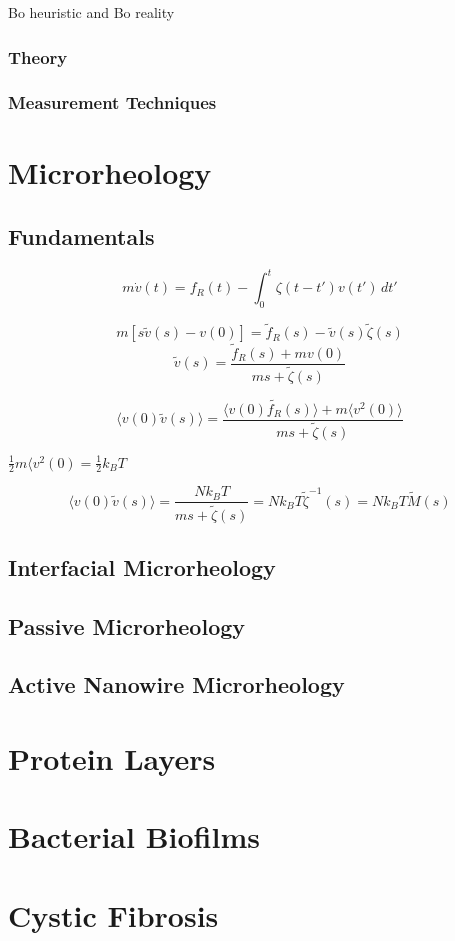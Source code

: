 Bo heuristic and Bo reality
\subsubsection{Theory}
\subsubsection{Measurement Techniques}
\section{Microrheology}
\subsection{Fundamentals}

\begin{equation}
  m\dot{v}(t) = f_R(t) - \int_0^t\zeta(t-t')v(t')\,dt'
\end{equation}

\begin{equation}
  m\left[s\tilde{v}(s) - v(0)\right] = \tilde{f}_R(s) - \tilde{v}(s)\tilde{\zeta}(s)
\end{equation}
\begin{equation}
  \tilde{v}(s) = \frac{\tilde{f}_R(s) + mv(0)}{ms + \tilde{\zeta}(s)}
\end{equation}

\begin{equation}
  \langle v(0)\tilde{v}(s) \rangle = \frac{\langle v(0)\tilde{f_R}(s)\rangle + m \langle v^2(0)\rangle}{ms + \tilde{\zeta}(s)}
\end{equation}

$\frac{1}{2}m\langle v^2(0) = \frac{1}{2}k_B T$

\begin{equation}
  \langle v(0)\tilde{v}(s) \rangle = \frac{Nk_B T}{ms + \tilde{\zeta}(s)} = Nk_B T \tilde{\zeta}^{-1}(s) = Nk_B T \tilde{M}(s)
\end{equation}

\subsection{Interfacial Microrheology}

\subsection{Passive Microrheology}


\subsection{Active Nanowire Microrheology}


\section{Protein Layers}
\section{Bacterial Biofilms}
\section{Cystic Fibrosis}
